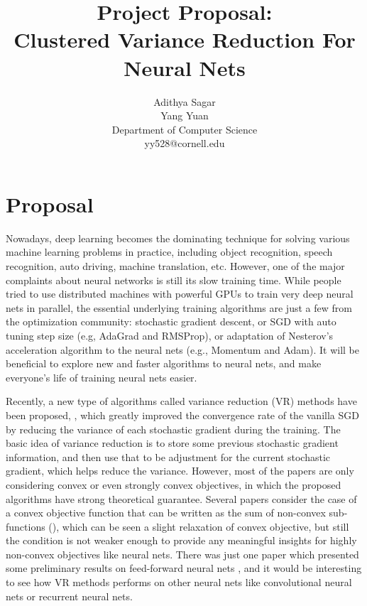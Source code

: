 \documentclass{article} %
\title{Project Proposal: \\Clustered Variance Reduction For Neural Nets}
\author{
Adithya Sagar\\
\And
Yang Yuan  \\
Department of Computer Science\\
yy528@cornell.edu
}
\begin{document}
\maketitle


\section{Proposal}
Nowadays, deep learning becomes the dominating technique for solving various machine learning problems in practice, including object recognition, speech recognition, auto driving, machine translation, etc. 
However, one of the major complaints about neural networks is still its slow training time. While people tried to use distributed machines with powerful GPUs to train very deep neural nets in parallel, the essential underlying training algorithms are just a few from the optimization community: stochastic gradient descent, or SGD with auto tuning step size (e.g, AdaGrad and RMSProp), or adaptation of Nesterov's acceleration algorithm to the neural nets (e.g., Momentum and Adam). It 
will be beneficial to explore new and faster algorithms to neural nets, and make everyone's life of training neural nets easier. 

Recently, a new type of algorithms called variance reduction (VR) methods have been proposed, 
\cite{JohnsonZhang2013-SVRG,Shalev-Shwartz2013-SDCA,Schmidt2013-SAG,Shalev-ShwartzZhang2014-ProxSDCA,XiaoZhang2014-ProximalSVRG,Defazio2014-Finito,Defazio2014-SAGA,Mairal2015-MISO,UniVR, exploitingstructure},
which greatly improved the convergence rate of the vanilla SGD by reducing the variance of each stochastic gradient during the training. 
The basic idea of variance reduction is to store some previous stochastic gradient information, and then use that to be adjustment for the current stochastic gradient, which helps reduce the variance.
However, most of the papers are only considering convex or even strongly convex objectives, in which the proposed algorithms have strong theoretical guarantee. Several papers consider the case of a convex objective function that can be written as the sum of non-convex sub-functions (\cite{Shalev-Shwartz2015-SDCAwithoutDual,UniVR}), which can be seen a slight relaxation of convex objective, but still the condition is not weaker enough to provide any meaningful insights for highly non-convex objectives like neural nets. There was just one paper which presented some preliminary results on feed-forward neural nets \cite{JohnsonZhang2013-SVRG}, and it would be interesting to see how VR methods performs on other neural nets like convolutional neural nets or recurrent neural nets.
\end{document}

